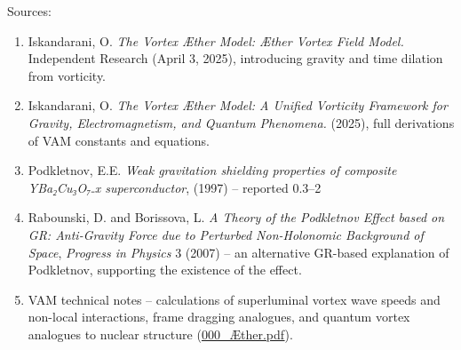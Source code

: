 Sources:


\begin{enumerate}

\item 
Iskandarani, O. \textit{The Vortex Æther Model: Æther Vortex Field Model.} Independent Research (April 3, 2025), introducing gravity and time dilation from vorticity.




\item 
Iskandarani, O. \textit{The Vortex Æther Model: A Unified Vorticity Framework for Gravity, Electromagnetism, and Quantum Phenomena.} (2025), full derivations of VAM constants and equations.




\item 
Podkletnov, E.E. \textit{Weak gravitation shielding properties of composite YBa₂Cu₃O₇₋x superconductor}, (1997) – reported 0.3–2%




\item 
Rabounski, D. and Borissova, L. \textit{A Theory of the Podkletnov Effect based on GR: Anti-Gravity Force due to Perturbed Non-Holonomic Background of Space}, \textit{Progress in Physics} 3 (2007) – an alternative GR-based explanation of Podkletnov, supporting the existence of the effect.




\item 
VAM technical notes – calculations of superluminal vortex wave speeds and non-local interactions, frame dragging analogues, and quantum vortex analogues to nuclear structure (\href{file://file-f6wuuwzjgr23npodmed4pi%23:~:text=in%20a%20dynamic%20picture,%20absorption,electron%20changing%20orbitals/}{000_Æther.pdf}).




\end{enumerate}